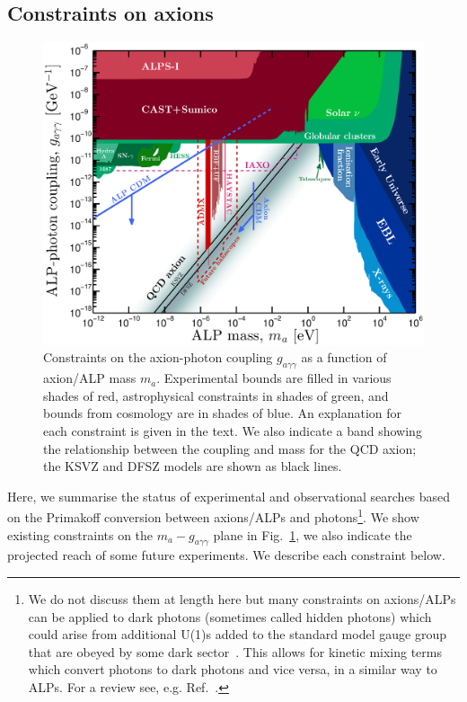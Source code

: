 \subsection{Constraints on axions}\label{sec:axions_constraints}
\begin{figure}
\begin{center}
\includegraphics[width=\textwidth]{Figures/axionconstraints.eps}
\caption[Constraints on the ALP-photon coupling]{Constraints on the axion-photon coupling $g_{a\gamma\gamma}$ as a function of axion/ALP mass $m_a$. Experimental bounds are filled in various shades of red, astrophysical constraints in shades of green, and bounds from cosmology are in shades of blue. An explanation for each constraint is given in the text. We also indicate a band showing the relationship between the coupling and mass for the QCD axion; the KSVZ and DFSZ models are shown as black lines.}\label{fig:axionconstraints}
\end{center}
\end{figure}
Here, we summarise the status of experimental and observational searches based on the Primakoff conversion between axions/ALPs and photons\footnote{We do not discuss them at length here but many constraints on axions/ALPs can be applied to dark photons (sometimes called hidden photons) which could arise from additional U(1)s added to the standard model gauge group that are obeyed by some dark sector~\cite{Holdom:1985ag}. This allows for kinetic mixing terms which convert photons to dark photons and vice versa, in a similar way to ALPs. For a review see, e.g. Ref.~\cite{Jaeckel:2013ija}.}. We show existing constraints on the $m_a - g_{a\gamma\gamma}$ plane in Fig.~\ref{fig:axionconstraints}, we also indicate the projected reach of some future experiments. We describe each constraint below.

